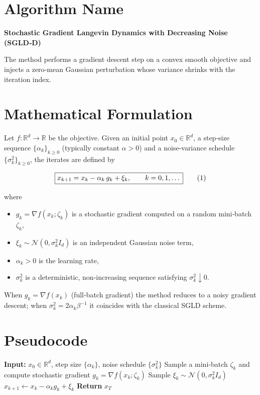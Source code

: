 \documentclass[11pt]{article}
\newcommand{\R}{\mathbb{R}}
\begin{document}
\section*{Algorithm Name}
\textbf{Stochastic Gradient Langevin Dynamics with Decreasing Noise (SGLD‑D)}  

The method performs a gradient descent step on a convex smooth objective and injects a zero‑mean Gaussian perturbation whose variance shrinks with the iteration index.

\section*{Mathematical Formulation}
Let $f:\R^{d}\rightarrow\R$ be the objective.  
Given an initial point $x_{0}\in\R^{d}$, a step‑size sequence $\{\alpha_{k}\}_{k\ge 0}$ (typically constant $\alpha>0$) and a noise‑variance schedule $\{\sigma_{k}^{2}\}_{k\ge 0}$, the iterates are defined by  

\[
\boxed{%
x_{k+1}=x_{k}-\alpha_{k}\,g_{k}+\xi_{k},\qquad k=0,1,\dots
}
\tag{1}
\]

where  

\begin{itemize}
    \item $g_{k}= \nabla f(x_{k};\zeta_{k})$ is a stochastic gradient computed on a random mini‑batch $\zeta_{k}$,
    \item $\xi_{k}\sim\mathcal N(0,\sigma_{k}^{2}I_{d})$ is an independent Gaussian noise term,
    \item $\alpha_{k}>0$ is the learning rate,
    \item $\sigma_{k}^{2}$ is a deterministic, non‑increasing sequence satisfying $\sigma_{k}^{2}\downarrow 0$.
\end{itemize}

When $g_{k}=\nabla f(x_{k})$ (full‑batch gradient) the method reduces to a noisy gradient descent; when $\sigma_{k}^{2}=2\alpha_{k}\beta^{-1}$ it coincides with the classical SGLD scheme.

\section*{Pseudocode}
\begin{algorithm}[H]
\caption{SGLD‑D}
\begin{algorithmic}[1]
\STATE \textbf{Input:} $x_{0}\in\R^{d}$, step size $\{\alpha_{k}\}$, noise schedule $\{\sigma_{k}^{2}\}$
    \STATE Sample a mini‑batch $\zeta_{k}$ and compute stochastic gradient $g_{k}= \nabla f(x_{k};\zeta_{k})$
    \STATE Sample $\xi_{k}\sim\mathcal N(0,\sigma_{k}^{2}I_{d})$
    \STATE $x_{k+1}\leftarrow x_{k}-\alpha_{k} g_{k}+\xi_{k}$
\ENDFOR
\STATE \textbf{Return} $x_{T}$
\end{algorithmic}
\end{algorithm}
\end{document}
